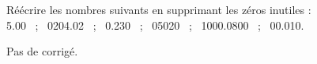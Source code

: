 \begin{exercice*}
    Réécrire les nombres suivants en supprimant les zéros inutiles : \\
    \num{5.00} \, ; \, \num{0204.02} \, ; \, \num{0.230} \, ; \, \num{05 020} \, ; \, \num{1000.0800} \, ; \, \num{00.010}.
 \end{exercice*}
\begin{corrige}
  Pas de corrigé.
\end{corrige}